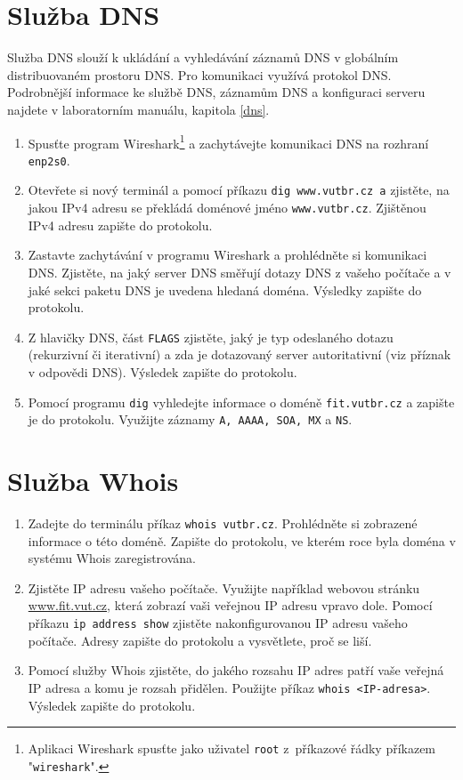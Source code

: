 \documentclass[a4paper,11pt]{article}
\begin{document}
\section{Služba DNS}
Služba DNS slouží k ukládání a vyhledávání záznamů DNS v globálním distribuovaném prostoru DNS. Pro komunikaci využívá protokol DNS. Podrobnější informace ke službě DNS, záznamům DNS a konfiguraci serveru najdete v laboratorním manuálu, kapitola \ref{dns}. 
\begin{enumerate}
    \item Spusťte program Wireshark\footnote{Aplikaci Wireshark spusťte jako uživatel \texttt{root} z~příkazové řádky příkazem "\texttt{wireshark}".} a zachytávejte komunikaci DNS na rozhraní \texttt{enp2s0}.
    \item Otevřete si nový terminál a pomocí příkazu \texttt{dig www.vutbr.cz a} zjistěte, na jakou IPv4 adresu se překládá doménové jméno \texttt{www.vutbr.cz}. Zjištěnou IPv4 adresu zapište do protokolu.
    \item Zastavte zachytávání v programu Wireshark a prohlédněte si komunikaci DNS. Zjistěte, na jaký server DNS směřují dotazy DNS z vašeho počítače a v jaké sekci paketu DNS je uvedena hledaná doména. Výsledky zapište do protokolu.
    \item Z hlavičky DNS, část \texttt{FLAGS} zjistěte, jaký je typ odeslaného dotazu (rekurzivní či iterativní) a zda je dotazovaný server autoritativní (viz příznak v odpovědi DNS). Výsledek zapište do protokolu.  
    \item Pomocí programu {\tt dig} vyhledejte informace o doméně {\tt fit.vutbr.cz} a zapište je do protokolu. Využijte záznamy \texttt{A, AAAA, SOA, MX} a {\tt NS}.
\end{enumerate}

\section{Služba Whois}
\begin{enumerate}
    \item Zadejte do terminálu příkaz \texttt{whois vutbr.cz}. Prohlédněte si zobrazené informace o této doméně. Zapište do protokolu, ve kterém roce byla doména v systému Whois zaregistrována.
    \item Zjistěte IP adresu vašeho počítače. Využijte například  webovou stránku \url{www.fit.vut.cz}, která zobrazí vaši veřejnou IP adresu vpravo dole. Pomocí příkazu \texttt{ip address show} zjistěte nakonfigurovanou IP adresu vašeho počítače. Adresy zapište do protokolu a vysvětlete, proč se liší. 
    \item Pomocí služby Whois zjistěte, do jakého rozsahu IP adres patří vaše veřejná IP adresa a komu je rozsah přidělen. Použijte příkaz \texttt{whois <IP-adresa>}. Výsledek zapište do protokolu.
\end{enumerate}
\end{document}

